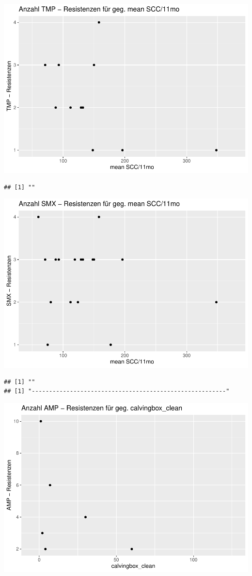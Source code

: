 \documentclass[
]{article}
\begin{document}
\includegraphics{NResistenzen_files/figure-latex/unnamed-chunk-6-19.pdf}

\begin{verbatim}
## [1] ""
\end{verbatim}

\includegraphics{NResistenzen_files/figure-latex/unnamed-chunk-6-20.pdf}

\begin{verbatim}
## [1] ""
## [1] "--------------------------------------------------------"
\end{verbatim}

\includegraphics{NResistenzen_files/figure-latex/unnamed-chunk-6-21.pdf}
\end{document}
